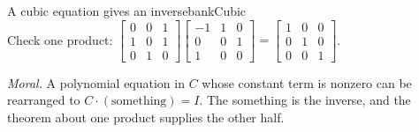 \documentclass[11pt]{article}
\begin{document}
\begin{exmp}{A cubic equation gives an inverse}{bankCubic}
\[\]
Check one product: $\begin{bmatrix}0&0&1\\1&0&1\\0&1&0\end{bmatrix}\begin{bmatrix}-1&1&0\\0&0&1\\1&0&0\end{bmatrix}=\begin{bmatrix}1&0&0\\0&1&0\\0&0&1\end{bmatrix}$.

\emph{Moral.} A polynomial equation in $C$ whose constant term is nonzero can be rearranged to $C\cdot(\text{something})=I$. The something is the inverse, and the theorem about one product supplies the other half.
\end{exmp}
\end{document}
